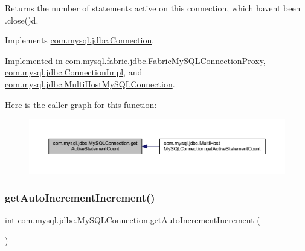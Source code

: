 Returns the number of statements active on this connection, which haven\textquotesingle{}t been .close()d. 

Implements \mbox{\hyperlink{interfacecom_1_1mysql_1_1jdbc_1_1_connection_a7a8d8535f6988783755465a542f45ea1}{com.\+mysql.\+jdbc.\+Connection}}.



Implemented in \mbox{\hyperlink{classcom_1_1mysql_1_1fabric_1_1jdbc_1_1_fabric_my_s_q_l_connection_proxy_acf661f15fbd7b77665f37e17cfa24520}{com.\+mysql.\+fabric.\+jdbc.\+Fabric\+My\+S\+Q\+L\+Connection\+Proxy}}, \mbox{\hyperlink{classcom_1_1mysql_1_1jdbc_1_1_connection_impl_ab89e48067b2d2b3e3257896c5bed6706}{com.\+mysql.\+jdbc.\+Connection\+Impl}}, and \mbox{\hyperlink{classcom_1_1mysql_1_1jdbc_1_1_multi_host_my_s_q_l_connection_a88b613d50112e08095b5f72017b4deea}{com.\+mysql.\+jdbc.\+Multi\+Host\+My\+S\+Q\+L\+Connection}}.

Here is the caller graph for this function\+:
\nopagebreak
\begin{figure}[H]
\begin{center}
\leavevmode
\includegraphics[width=350pt]{interfacecom_1_1mysql_1_1jdbc_1_1_my_s_q_l_connection_aa42802b4debbacd9680e2ca0b70fd53d_icgraph}
\end{center}
\end{figure}
\mbox{\label{interfacecom_1_1mysql_1_1jdbc_1_1_my_s_q_l_connection_acb6ababcad41a91c6a44d300d09acff9}} 
\subsubsection{\texorpdfstring{get\+Auto\+Increment\+Increment()}{getAutoIncrementIncrement()}}
{\footnotesize\ttfamily int com.\+mysql.\+jdbc.\+My\+S\+Q\+L\+Connection.\+get\+Auto\+Increment\+Increment (\begin{DoxyParamCaption}{ }\end{DoxyParamCaption})}

